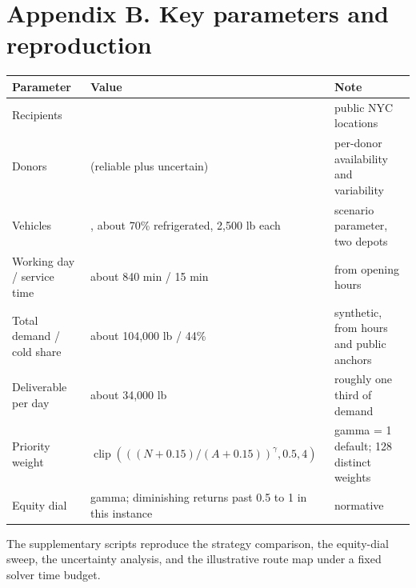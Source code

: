 \documentclass[
  11pt,
]{article}
\newcounter{none} %
\begin{document}
\section{Appendix B. Key parameters and
reproduction}\label{appendix-b.-key-parameters-and-reproduction}

{\def\LTcaptype{none} %
\begin{longtable}[]{@{}
  >{\raggedright\arraybackslash}p{}
  >{\raggedright\arraybackslash}p{}
  >{\raggedright\arraybackslash}p{}@{}}
\toprule\noalign{}
\begin{minipage}[b]{\linewidth}\raggedright
Parameter
\end{minipage} & \begin{minipage}[b]{\linewidth}\raggedright
Value
\end{minipage} & \begin{minipage}[b]{\linewidth}\raggedright
Note
\end{minipage} \\
\midrule\noalign{}
\endhead
\bottomrule\noalign{}
\endlastfoot
Recipients & 528 & public NYC locations \\
Donors & 18 (reliable plus uncertain) & per-donor availability and
variability \\
Vehicles & 25, about 70\% refrigerated, 2,500 lb each & scenario
parameter, two depots \\
Working day / service time & about 840 min / 15 min & from opening
hours \\
Total demand / cold share & about 104,000 lb / 44\% & synthetic, from
hours and public anchors \\
Deliverable per day & about 34,000 lb & roughly one third of demand \\
Priority weight &
\(\operatorname{clip}(((N+0.15)/(A+0.15))^{\gamma}, 0.5, 4)\) & gamma =
1 default; 128 distinct weights \\
Equity dial & gamma; diminishing returns past 0.5 to 1 in this instance
& normative \\
\end{longtable}
}

The supplementary scripts reproduce the strategy comparison, the
equity-dial sweep, the uncertainty analysis, and the illustrative route
map under a fixed solver time budget.
\end{document}
